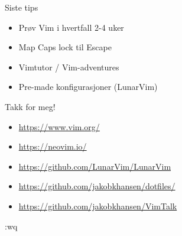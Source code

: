 \documentclass{beamer}
\begin{document}
\begin{frame}{Siste tips}
    \begin{itemize}
        \item Prøv Vim i hvertfall 2-4 uker
        \item Map Caps lock til Escape
        \item Vimtutor / Vim-adventures
        \item Pre-made konfigurasjoner (LunarVim)
    \end{itemize}
\end{frame}
\begin{frame}{Takk for meg!}
    \begin{itemize}
        \item \url{https://www.vim.org/}
        \item \url{https://neovim.io/}
        \item \url{https://github.com/LunarVim/LunarVim}
        \item \url{https://github.com/jakobkhansen/dotfiles/}
        \item \url{https://github.com/jakobkhansen/VimTalk}
    \end{itemize}
    :wq
\end{frame}

\begin{frame}
\end{frame}
\end{document}
